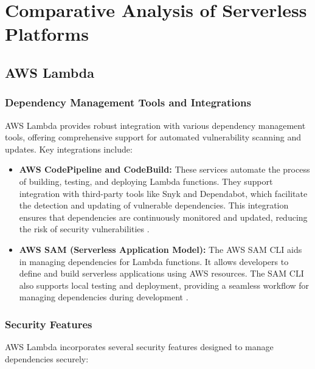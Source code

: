\documentclass[sigconf]{acmart}
\begin{document}
\section{Comparative Analysis of Serverless Platforms}

\subsection{AWS Lambda}

\subsubsection{Dependency Management Tools and Integrations}

AWS Lambda provides robust integration with various dependency management tools, offering comprehensive support for automated vulnerability scanning and updates. Key integrations include:

\begin{itemize}
    \item \textbf{AWS CodePipeline and CodeBuild:} These services automate the process of building, testing, and deploying Lambda functions. They support integration with third-party tools like Snyk and Dependabot, which facilitate the detection and updating of vulnerable dependencies. This integration ensures that dependencies are continuously monitored and updated, reducing the risk of security vulnerabilities \cite{awsCI2023}.
    \item \textbf{AWS SAM (Serverless Application Model):} The AWS SAM CLI aids in managing dependencies for Lambda functions. It allows developers to define and build serverless applications using AWS resources. The SAM CLI also supports local testing and deployment, providing a seamless workflow for managing dependencies during development \cite{awssam2023}.
\end{itemize}

\subsubsection{Security Features}

AWS Lambda incorporates several security features designed to manage dependencies securely:
\end{document}
